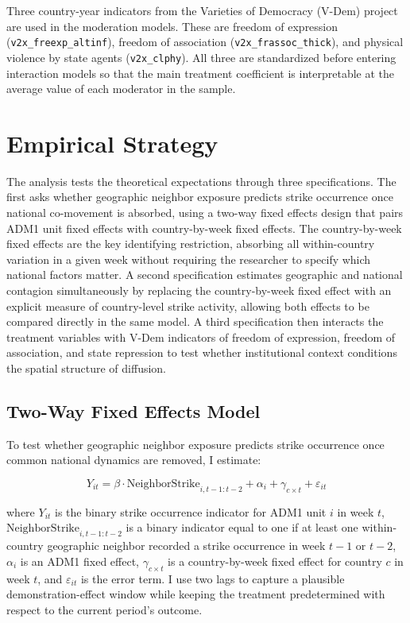 \documentclass[
  11pt,
]{article}
\begin{document}
Three country-year indicators from the Varieties of Democracy (V-Dem)
project are used in the moderation models. These are freedom of
expression (\texttt{v2x\_freexp\_altinf}), freedom of association
(\texttt{v2x\_frassoc\_thick}), and physical violence by state agents
(\texttt{v2x\_clphy}). All three are standardized before entering
interaction models so that the main treatment coefficient is
interpretable at the average value of each moderator in the sample.

\section{Empirical Strategy}\label{empirical-strategy}

The analysis tests the theoretical expectations through three
specifications. The first asks whether geographic neighbor exposure
predicts strike occurrence once national co-movement is absorbed, using
a two-way fixed effects design that pairs ADM1 unit fixed effects with
country-by-week fixed effects. The country-by-week fixed effects are the
key identifying restriction, absorbing all within-country variation in a
given week without requiring the researcher to specify which national
factors matter. A second specification estimates geographic and national
contagion simultaneously by replacing the country-by-week fixed effect
with an explicit measure of country-level strike activity, allowing both
effects to be compared directly in the same model. A third specification
then interacts the treatment variables with V-Dem indicators of freedom
of expression, freedom of association, and state repression to test
whether institutional context conditions the spatial structure of
diffusion.

\subsection{Two-Way Fixed Effects
Model}\label{two-way-fixed-effects-model}

To test whether geographic neighbor exposure predicts strike occurrence
once common national dynamics are removed, I estimate:

\[Y_{it} = \beta \cdot \text{NeighborStrike}_{i,t-1:t-2} + \alpha_i + \gamma_{c \times t} + \varepsilon_{it}\]

\noindent where \(Y_{it}\) is the binary strike occurrence indicator for
ADM1 unit \(i\) in week \(t\), \(\text{NeighborStrike}_{i,t-1:t-2}\) is
a binary indicator equal to one if at least one within-country
geographic neighbor recorded a strike occurrence in week \(t-1\) or
\(t-2\), \(\alpha_i\) is an ADM1 fixed effect, \(\gamma_{c \times t}\)
is a country-by-week fixed effect for country \(c\) in week \(t\), and
\(\varepsilon_{it}\) is the error term. I use two lags to capture a
plausible demonstration-effect window while keeping the treatment
predetermined with respect to the current period's outcome.
\end{document}

